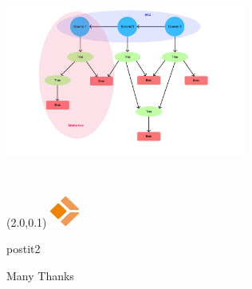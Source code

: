 \documentclass[11pt,xcolor={dvipsnames}]{beamer} %
\newcommand{\MyLogo}{%
\begin{textblock}{14}(2.0,0.1)
 \includegraphics[height=1cm, angle=0]{logo}
\end{textblock}
}
\begin{document}
\begin{frame}
	\includegraphics[height=250px,width=300px]{commit-graph.png}
\end{frame}
\begin{frame}
	\transboxin
	\MyLogo
	\vspace{1.0cm}
	\begin{beamercolorbox}[sep=1.0cm, center, shadow=false, rounded=true]{postit2}
		\begin{Huge}Many Thanks\end{Huge}
	\end{beamercolorbox}
\end{frame}
\end{document}
